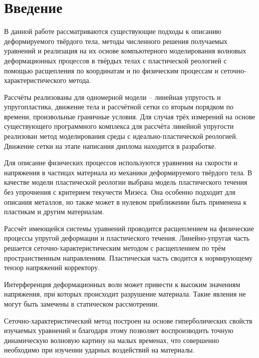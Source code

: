 \section*{Введение}
В данной работе рассматриваются существующие подходы к описанию деформируемого твёрдого тела, методы численного решения получаемых уравнений и реализация на их основе компьютерного моделирования волновых деформационных процессов в твёрдых телах с пластической реологией с помощью расщепления по координатам и по физическим процессам и сеточно-характеристического метода. 

Рассчёты реализованы для одномерной модели -- линейная упругость и упругопластика, движение тела и рассчётной сетки со вторым порядком по времени, произвольные граничные условия. Для случая трёх измерений на основе существующего программного комплекса для рассчёта линейной упругости реализован метод моделирования среды с идеально-пластической реологией. Движение сетки на этапе написания диплома находится в разработке. 

Для описание физических процессов используются уравнения на скорости и напряжения в частицах материала из механики деформируемого твёрдого тела. В качестве модели пластической реологии выбрана модель пластического течения без упрочнения с критерием текучести Мизеса. Она особенно подходит для описания металлов, но также может в нулевом приближении быть применена к пластикам и другим материалам.

Рассчёт имеющейся системы уравнений проводится расщеплением на физические процессы упругой деформации и пластического течения. Линейно-упругая часть решается сеточно-характеристическим методом с расщеплением по трём пространственным направлениям. Пластическая часть сводится к нормирующему тензор напряжений корректору. 

Интерференция деформационных волн может привести к высоким значениям напряжения, при которых происходит разрушение материала. Такие явления не могут быть замечены в статическом рассмотрении. 

Сеточно-характеристический метод построен на основе гиперболических свойств изучаемых уравнений и благодаря этому позволяет воспроизводить точную динамическую волновую картину на малых временах, что совершенно необходимо при изучении ударных воздействий на материалы. 

